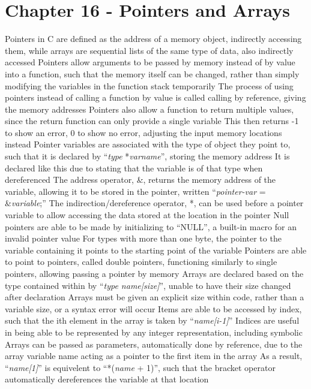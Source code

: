 \documentclass[11 pt, twoside]{article}
\newenvironment{outline*}
{
	\begin{outline}[enumerate]
	}
	{\end{outline}
}
\begin{document}
\section{Chapter 16 - Pointers and Arrays}
\begin{outline*}
\1 Pointers in C are defined as the address of a memory object, indirectly accessing them, while arrays are sequential lists of the same type of data, also indirectly accessed
\1 Pointers allow arguments to be passed by memory instead of by value into a function, such that the memory itself can be changed, rather than simply modifying the variables in the function stack temporarily
\2 The process of using pointers instead of calling a function by value is called calling by reference, giving the memory addresses
\3 Pointers also allow a function to return multiple values, since the return function can only provide a single variable
\3 This then returns -1 to show an error, 0 to show no error, adjusting the input memory locations instead
\2 Pointer variables are associated with the type of object they point to, such that it is declared by ``\textit{type} *\textit{varname}'', storing the memory address
\3 It is declared like this due to stating that the variable is of that type when dereferenced
\2 The address operator, \&, returns the memory address of the variable, allowing it to be stored in the pointer, written ``\textit{pointer-var} = \&\textit{variable};''
\2 The indirection/dereference operator, *, can be used before a pointer variable to allow accessing the data stored at the location in the pointer
\2 Null pointers are able to be made by initializing to ``NULL'', a built-in macro for an invalid pointer value
\2 For types with more than one byte, the pointer to the variable containing it points to the starting point of the variable
\2 Pointers are able to point to pointers, called double pointers, functioning similarly to single pointers, allowing passing a pointer by memory
\1 Arrays are declared based on the type contained within by ``\textit{type name[size]}'', unable to have their size changed after declaration
\2 Arrays must be given an explicit size within code, rather than a variable size, or a syntax error will occur
\2 Items are able to be accessed by index, such that the ith element in the array is taken by ``\textit{name[i-1]}''
\3 Indices are useful in being able to be represented by any integer representation, including symbolic
\2 Arrays can be passed as parameters, automatically done by reference, due to the array variable name acting as a pointer to the first item in the array
\3 As a result, ``\textit{name[1]}'' is equivelent to ``*(\textit{name} + 1)'', such that the bracket operator automatically dereferences the variable at that location

\end{outline*}
\end{document}

